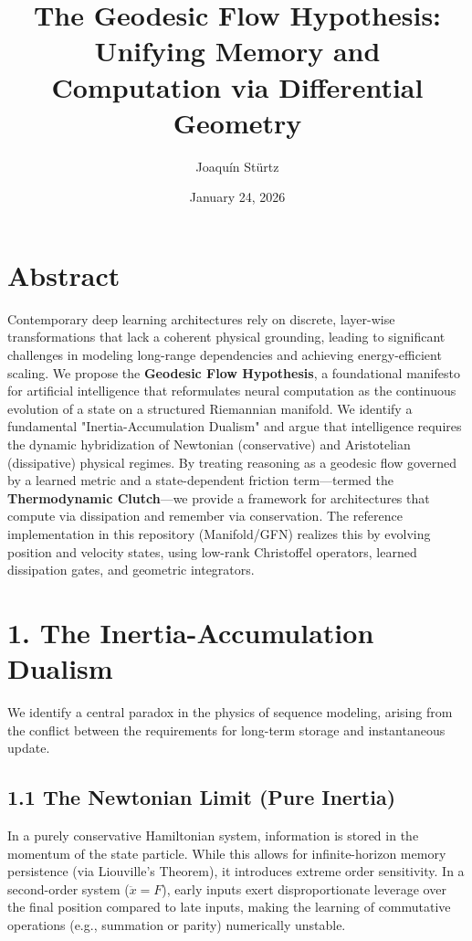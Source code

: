 \documentclass[12pt]{article}
\title{\textbf{The Geodesic Flow Hypothesis: Unifying Memory and Computation via Differential Geometry}}
\author{Joaquín Stürtz}
\date{January 24, 2026}
\begin{document}
\maketitle

\section*{Abstract}

Contemporary deep learning architectures rely on discrete, layer-wise transformations that lack a coherent physical grounding, leading to significant challenges in modeling long-range dependencies and achieving energy-efficient scaling. We propose the \textbf{Geodesic Flow Hypothesis}, a foundational manifesto for artificial intelligence that reformulates neural computation as the continuous evolution of a state on a structured Riemannian manifold. We identify a fundamental "Inertia-Accumulation Dualism" and argue that intelligence requires the dynamic hybridization of Newtonian (conservative) and Aristotelian (dissipative) physical regimes. By treating reasoning as a geodesic flow governed by a learned metric and a state-dependent friction term—termed the \textbf{Thermodynamic Clutch}—we provide a framework for architectures that compute via dissipation and remember via conservation. The reference implementation in this repository (Manifold/GFN) realizes this by evolving position and velocity states, using low-rank Christoffel operators, learned dissipation gates, and geometric integrators.

\section{1. The Inertia-Accumulation Dualism}

We identify a central paradox in the physics of sequence modeling, arising from the conflict between the requirements for long-term storage and instantaneous update.

\subsection*{1.1 The Newtonian Limit (Pure Inertia)}

In a purely conservative Hamiltonian system, information is stored in the momentum of the state particle. While this allows for infinite-horizon memory persistence (via Liouville's Theorem), it introduces extreme order sensitivity. In a second-order system ($\ddot{x} = F$), early inputs exert disproportionate leverage over the final position compared to late inputs, making the learning of commutative operations (e.g., summation or parity) numerically unstable.
\end{document}
